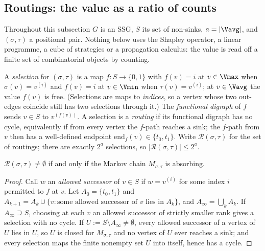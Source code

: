 
\subsection{Routings: the value as a ratio of counts}\label{sec:fresh19}

Throughout this subsection $G$ is an SSG, $S$ its set of non-sinks, $a=|\Vavg|$,
and $(\sigma,\tau)$ a positional pair.  Nothing below uses the Shapley operator,
a linear programme, a cube of strategies or a propagation calculus: the value is
read off a finite set of combinatorial objects by counting.

\begin{definition}\label{fresh19:def-routing}
A \emph{selection} for $(\sigma,\tau)$ is a map $f\colon S\to\{0,1\}$ with
$f(v)=i$ at $v\in\Vmax$ when $\sigma(v)=v^{(i)}$ and $f(v)=i$ at $v\in\Vmin$
when $\tau(v)=v^{(i)}$; at $v\in\Vavg$ the value $f(v)$ is free.  (Selections
are maps to \emph{indices}, so a vertex whose two out-edges coincide still has
two selections through it.)  The \emph{functional digraph} of $f$ sends $v\in S$
to $v^{(f(v))}$.  A selection is a \emph{routing} if its functional digraph has
no cycle, equivalently if from every vertex the $f$-path reaches a sink; the
$f$-path from $v$ then has a well-defined endpoint
$\mathrm{end}_f(v)\in\{t_0,t_1\}$.  Write $\mathcal R(\sigma,\tau)$ for the set
of routings; there are exactly $2^{a}$ selections, so
$|\mathcal R(\sigma,\tau)|\le2^{a}$.
\end{definition}

\begin{lemma}\label{fresh19:lem-nonempty}
$\mathcal R(\sigma,\tau)\ne\emptyset$ if and only if the Markov chain
$M_{\sigma,\tau}$ is absorbing.
\end{lemma}

\begin{proof}
Call $w$ an \emph{allowed successor} of $v\in S$ if $w=v^{(i)}$ for some index
$i$ permitted to $f$ at $v$.  Let $A_0=\{t_0,t_1\}$ and
$A_{k+1}=A_k\cup\{v:\text{some allowed successor of }v\text{ lies in }A_k\}$, and
$A_\infty=\bigcup_kA_k$.  If $A_\infty\supseteq S$, choosing at each $v$ an
allowed successor of strictly smaller rank gives a selection with no cycle.  If
$U:=S\setminus A_\infty\ne\emptyset$, every allowed successor of a vertex of $U$
lies in $U$, so $U$ is closed for $M_{\sigma,\tau}$ and no vertex of $U$ ever
reaches a sink; and every selection maps the finite nonempty set $U$ into
itself, hence has a cycle.
\end{proof}

